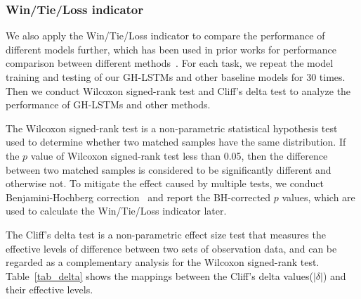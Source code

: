 \documentclass[journal]{IEEEtran}
\begin{document}
\subsubsection{Win/Tie/Loss indicator}

We also apply the Win/Tie/Loss indicator to compare the performance of different models further, which has been used in prior works for performance comparison between different methods~\cite{fan2019deep,liu2018connecting}. For each task, we repeat the model training and testing of our GH-LSTMs and other baseline models for 30 times. Then we conduct Wilcoxon signed-rank test and Cliff’s delta test to analyze the performance of GH-LSTMs and other methods.

The Wilcoxon signed-rank test is a non-parametric statistical hypothesis test used to determine whether two matched samples have the same distribution. If the $p$ value of Wilcoxon signed-rank test less than 0.05, then the difference between two matched samples is considered to be significantly different and otherwise not. To mitigate the effect caused by multiple tests, we conduct Benjamini-Hochberg correction~\cite{benjamini1995controlling} and report the BH-corrected $p$ values, which are used to calculate the Win/Tie/Loss indicator later.

The Cliff's delta test is a non-parametric effect size test that measures the effective levels of difference between two sets of observation data, and can be regarded as a complementary analysis for the Wilcoxon signed-rank test. Table~\ref{tab_delta} shows the mappings between the Cliff's delta values($|\delta|$) and their effective levels.
\end{document}
